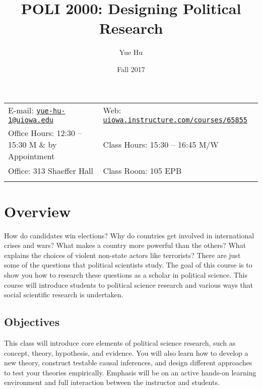 \documentclass[11pt,]{article}
\title{POLI 2000: Designing Political Research}
\author{Yue Hu}
\date{Fall 2017}
\theoremstyle{definition}
\theoremstyle{definition}
\theoremstyle{definition}
\theoremstyle{remark}
\begin{document}
  

		\maketitle
		
	
		\thispagestyle{firststyle}



	\noindent \begin{tabular*}{\textwidth}{ @{\extracolsep{\fill}} ll @{\extracolsep{\fill}}}


E-mail: \texttt{\href{mailto:yue-hu-1@uiowa.edu}{\nolinkurl{yue-hu-1@uiowa.edu}}} & Web: \href{http://uiowa.instructure.com/courses/65855}{\tt uiowa.instructure.com/courses/65855}\\
Office Hours: 12:30 -- 15:30 M \& by Appointment  &  Class Hours: 15:30 -- 16:45 M/W\\
Office: 313 Shaeffer Hall  & Class Room: 105 EPB\\
	&  \\
	\hline
	\end{tabular*}
	
\vspace{2mm}
	


\section{Overview}\label{overview}

How do candidates win elections? Why do countries get involved in
international crises and wars? What makes a country more powerful than
the others? What explains the choices of violent non-state actors like
terrorists? There are just some of the questions that political
scientists study. The goal of this course is to show you how to research
these questions as a scholar in political science. This course will
introduce students to political science research and various ways that
social scientific research is undertaken.

\subsection{Objectives}\label{objectives}

This class will introduce core elements of political science research,
such as concept, theory, hypothesis, and evidence. You will also learn
how to develop a new theory, construct testable causal inferences, and
design different approaches to test your theories empirically. Emphasis
will be on an active hands-on learning environment and full interaction
between the instructor and students.
\end{document}
